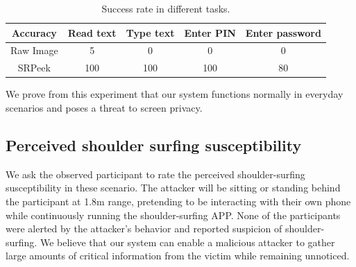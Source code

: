 \begin{table}[!t]
\centering
\caption{Success rate in different tasks.}
\label{table-task}
\begin{tabular}{@{}ccccc@{}}
	\toprule
Accuracy & Read text & Type text & Enter PIN & Enter password\\ \midrule
Raw Image & 5 & 0 & 0 & 0\\
SRPeek & 100 & 100 & 100 & 80\\ \bottomrule
\end{tabular}

\end{table}

We prove from this experiment that our system functions normally in everyday scenarios and poses a threat to screen privacy.

\subsection{Perceived shoulder surfing susceptibility}
We ask the observed participant to rate the perceived shoulder-surfing susceptibility in these scenario. The attacker will be sitting or standing behind the participant at 1.8m range, pretending to be interacting with their own phone while continuously running the shoulder-surfing APP. None of the participants were alerted by the attacker's behavior and reported suspicion of shoulder-surfing. We believe that our system can enable a malicious attacker to gather large amounts of critical information from the victim while remaining unnoticed.




